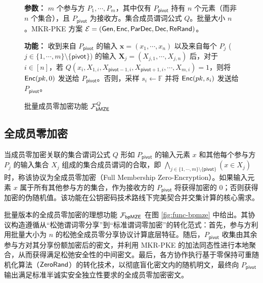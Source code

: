 \begin{figure}[!htb]
\begin{framed}
\begin{minipage}[c]{\textwidth}
\begin{trivlist}
\item \textbf{参数：} $m$ 个参与方 $P_1, \cdots, P_m$，其中仅有 $P_\mathsf{pivot}$ 持有 $n$ 个元素（而非 $n$ 个集合），且 $P_\mathsf{pivot}$ 为接收方。集合成员谓词公式 $Q$。批量大小 $n$。MKR-PKE 方案 $\mathcal{E} = (\mathsf{Gen}, \mathsf{Enc}, \mathsf{ParDec}, \mathsf{Dec}, \mathsf{ReRand})$。
\item \textbf{功能：} 收到来自 $P_\mathsf{pivot}$ 的输入 $\textbf{x} = (x_1, \cdots, x_n)$ 以及来自每个 $P_j$ ($j \in \{1,\cdots,m\} \setminus \{\mathsf{pivot}\}$) 的输入 $\textbf{X}_j = (X_{j,1}, \cdots, X_{j,n})$ 后，对于 $i \in [n]$，若 $Q(x_i,X_{1,i},X_{\mathsf{pivot}-1,i},X_{\mathsf{pivot}+1,i},\cdots,X_{m,i})=1$，则将 $\mathsf{Enc}(pk,0)$ 发送给 $P_\mathsf{pivot}$。否则，采样 $s_i \gets \mathbb{F}$ 并将 $\mathsf{Enc}(pk,s_i)$ 发送给 $P_\mathsf{pivot}$。
\end{trivlist}
\end{minipage}
\end{framed}
\caption{批量成员零加密功能 $\mathcal{F}_\mathsf{bMZE}^Q$}\label{fig:func-bmze}
\end{figure}

\subsection{全成员零加密}

当成员零加密关联的集合谓词公式 $Q$ 形如 $P_\mathsf{pivot}$ 的输入元素 $x$ 和其他每个参与方 $P_j$ 的输入集合 $X_j$ 组成的集合成员谓词的合取，即 $\bigwedge_{j \in \{1,\cdots,m\} \setminus \{\mathsf{pivot}\}} (x \in X_j)$ 时，称该协议为全成员零加密（Full Membership Zero-Encryption）。如果输入元素 $x$ 属于所有其他参与方的集合，作为接收方的 $P_\mathsf{pivot}$ 将获得加密的 0；否则获得加密的伪随机值。该功能在公钥密码技术路线下完美契合并交集计算的核心需求。

批量版本的全成员零加密的理想功能 $\mathcal{F}_\mathsf{bpMZE}$ 在图 \ref{fig:func-bpmze} 中给出。其协议构造遵循从“松弛谓词零分享”到“标准谓词零加密”的转化范式：首先，参与方利用批量大小为 $n$ 的松弛全成员零分享协议计算底层特征。随后，$P_\mathsf{pivot}$ 收集由其余参与方对其分享份额加密后的密文，并利用 MKR-PKE 的加法同态性进行本地聚合，从而获得满足松弛安全性的中间密文。最后，各方协作执行基于零保持可重随机化算法（$\mathsf{ZeroRand}$）的转化技术，以彻底盲化密文内的随机明文，最终向 $P_\mathsf{pivot}$ 输出满足标准半诚实安全独立性要求的全成员零加密密文。

